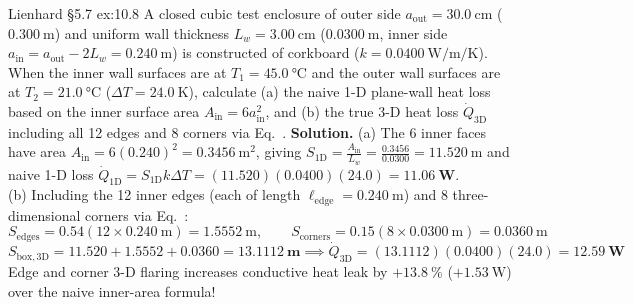\begin{workedexample}{Lienhard §5.7 }{ex:10.8}
A closed cubic test enclosure of outer side $a_{\mathrm{out}} = \SI{30.0}{\centi\meter}$ ($\SI{0.300}{\meter}$) and uniform wall thickness $L_w = \SI{3.00}{\centi\meter}$ ($\SI{0.0300}{\meter}$, inner side $a_{\mathrm{in}} = a_{\mathrm{out}} - 2L_w = \SI{0.240}{\meter}$) is constructed of corkboard ($k = \SI{0.0400}{\watt\per\meter\per\kelvin}$). When the inner wall surfaces are at $T_1 = \SI{45.0}{\celsius}$ and the outer wall surfaces are at $T_2 = \SI{21.0}{\celsius}$ ($\Delta T = \SI{24.0}{\kelvin}$), calculate (a) the naive 1-D plane-wall heat loss based on the inner surface area $A_{\mathrm{in}} = 6 a_{\mathrm{in}}^2$, and (b) the true 3-D heat loss $\dot{Q}_{\mathrm{3D}}$ including all 12 edges and 8 corners via Eq.~.
\tcblower
\textbf{Solution.} (a) The 6 inner faces have area $A_{\mathrm{in}} = 6(0.240)^2 = \SI{0.3456}{\square\meter}$, giving $S_{\mathrm{1D}} = \frac{A_{\mathrm{in}}}{L_w} = \frac{0.3456}{0.0300} = \SI{11.520}{\meter}$ and naive 1-D loss $\dot{Q}_{\mathrm{1D}} = S_{\mathrm{1D}}k\Delta T = (11.520)(0.0400)(24.0) = \mathbf{\SI{11.06}{\watt}}$.\\
(b) Including the 12 inner edges (each of length $\ell_{\mathrm{edge}} = \SI{0.240}{\meter}$) and 8 three-dimensional corners via Eq.~:
\[
  S_{\mathrm{edges}} = 0.54\left(12 \times \SI{0.240}{\meter}\right) = \SI{1.5552}{\meter}, \qquad
  S_{\mathrm{corners}} = 0.15\left(8 \times \SI{0.0300}{\meter}\right) = \SI{0.0360}{\meter}
\]
\[
  S_{\mathrm{box,3D}} = 11.520 + 1.5552 + 0.0360 = \mathbf{\SI{13.1112}{\meter}} \implies
  \dot{Q}_{\mathrm{3D}} = (13.1112)(0.0400)(24.0) = \mathbf{\SI{12.59}{\watt}}
\]
Edge and corner 3-D flaring increases conductive heat leak by $+\SI{13.8}{\percent}$ ($+\SI{1.53}{\watt}$) over the naive inner-area formula!
\end{workedexample}

